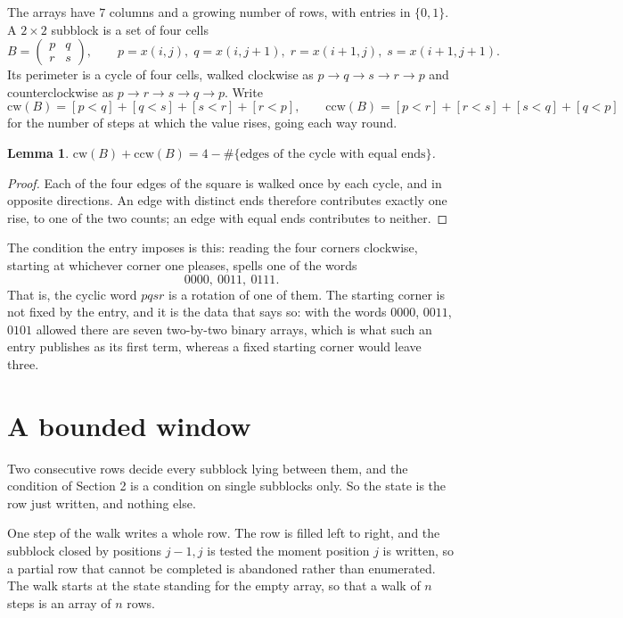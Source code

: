 \documentclass[11pt,a4paper]{article}
\theoremstyle{plain}
\newtheorem{lemma}[theorem]{Lemma}
\theoremstyle{definition}
\begin{document}
The arrays have $7$ columns and a growing number of rows, with entries in $\{0,1\}$. A
$2\times2$ subblock is a set of four cells
\[
B=\begin{pmatrix} p & q \\ r & s \end{pmatrix},
\qquad p=x(i,j),\; q=x(i,j+1),\; r=x(i+1,j),\; s=x(i+1,j+1).
\]
Its perimeter is a cycle of four cells, walked clockwise as $p\to q\to s\to r\to p$ and
counterclockwise as $p\to r\to s\to q\to p$. Write
\[
\mathrm{cw}(B)=[p<q]+[q<s]+[s<r]+[r<p],\qquad
\mathrm{ccw}(B)=[p<r]+[r<s]+[s<q]+[q<p]
\]
for the number of steps at which the value rises, going each way round.

\begin{lemma}\label{lem:sum}
$\mathrm{cw}(B)+\mathrm{ccw}(B)=4-\#\{\text{edges of the cycle with equal ends}\}$.
\end{lemma}

\begin{proof}
Each of the four edges of the square is walked once by each cycle, and in opposite directions.
An edge with distinct ends therefore contributes exactly one rise, to one of the two counts;
an edge with equal ends contributes to neither.
\end{proof}

The condition the entry imposes is this: reading the four corners clockwise, starting at whichever corner one pleases, spells one of the words
\[
0000,\ 0011,\ 0111.
\]
That is, the cyclic word $pqsr$ is a rotation of one of them. The starting corner is not fixed by the entry, and it is the data that says so: with the words $0000$, $0011$, $0101$ allowed there are seven two-by-two binary arrays, which is what such an entry publishes as its first term, whereas a fixed starting corner would leave three.

\section{A bounded window}

Two consecutive rows decide every subblock lying between them, and the condition of Section 2 is a condition on single subblocks only. So the state is the row just written, and nothing else.

One step of the walk writes a whole row. The row is filled left to right, and the subblock
closed by positions $j-1,j$ is tested the moment position $j$ is written, so a partial row that
cannot be completed is abandoned rather than enumerated. The walk starts at the state standing
for the empty array, so that a walk of $n$ steps is an array of $n$ rows.
\end{document}
